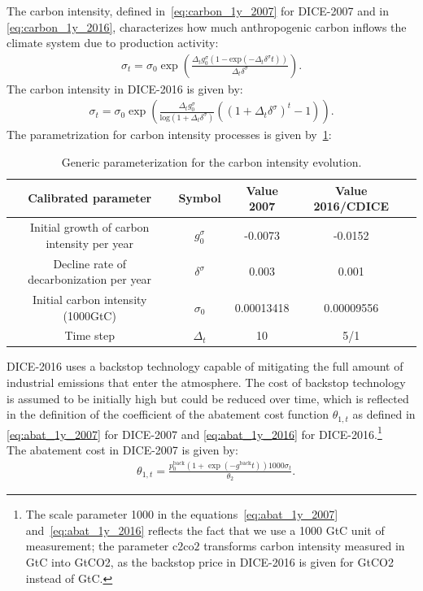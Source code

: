 \documentclass[11pt, a4paper, pdftex, twoside, dvipsnames]{article}
\begin{document}
\begin{appendices}
The carbon intensity, defined in~\cref{eq:carbon_1y_2007} for DICE-2007 and in \cref{eq:carbon_1y_2016}, characterizes how much anthropogenic carbon inflows the climate system due to production activity:
\begin{align}
      \label{eq:carbon_1y_2007}
      \sigma_{t} =
      \sigma_{0}\exp \left( \frac{\Delta_tg^\sigma_0 (1- \text{exp}(-\Delta_t\delta^\sigma t) )}{\Delta_t\delta^\sigma}   \right). 
\end{align}
\noindent The carbon intensity in DICE-2016 is given by:\\
\begin{align}
\label{eq:carbon_1y_2016}
        \sigma_{t} =
      \sigma_{0}\exp \left( \frac{\Delta_tg^\sigma_0 }{\text{log}(1+ \Delta_t\delta^\sigma) } \left( (1 + \Delta_t\delta^\sigma)^t -1 \right) \right).
\end{align}
The parametrization for carbon intensity processes is given by~\cref{table:sigma}:
\begin{table}[H]
\centering
\begin{tabular}{ c c c c c  } 
 \toprule
 Calibrated parameter & Symbol  & Value 2007 & Value 2016/CDICE \\ 
 \midrule
 Initial growth of carbon intensity per year & $g^\sigma_0$  & -0.0073 & -0.0152  \\ 
 Decline rate of decarbonization per year & $\delta^{\sigma}$  & 0.003 & 0.001 \\ 
 Initial carbon intensity (1000GtC) & $\sigma_0$  & 0.00013418 & 0.00009556 \\ 
 Time step & $\Delta_t$  & 10 & 5/1 \\
 \bottomrule
\end{tabular}
\caption{Generic parameterization for the carbon intensity evolution.}
\label{table:sigma}
\end{table}

DICE-2016 uses a backstop technology capable of mitigating the full amount of industrial emissions that enter the atmosphere. The cost of backstop technology is assumed to be initially high but could be reduced over time, which is reflected in the definition of the coefficient of the abatement cost function $\theta_{1,t}$ as defined in \cref{eq:abat_1y_2007} for DICE-2007 and  \cref{eq:abat_1y_2016} for DICE-2016.\footnote{The scale parameter 1000 in the equations~\eqref{eq:abat_1y_2007} and~\eqref{eq:abat_1y_2016} reflects the fact that we use a 1000 GtC unit of measurement; the parameter $\text{c2co2}$ transforms carbon intensity measured in GtC into GtCO2, as the backstop price in DICE-2016 is given for GtCO2 instead of GtC.}\\
The abatement cost in DICE-2007 is given by:\\
\begin{align}
        \label{eq:abat_1y_2007}
        &\theta_{1,t} =
        \frac{p^{\text{back}}_{0}(1+\exp\left(-g^{\text{back}}t \right))1000  \sigma_{t}}{\theta_{2}}.
\end{align}


\end{appendices}
\end{document}
